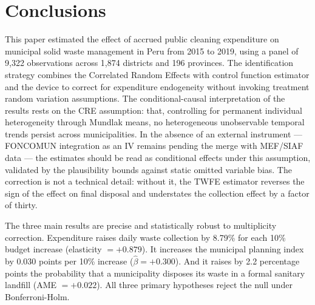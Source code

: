 
\section{Conclusions}
\label{sec:conclusiones}

This paper estimated the effect of accrued public cleaning expenditure on municipal solid waste management in Peru from 2015 to 2019, using a panel of 9,322 observations across 1,874 districts and 196 provinces. The identification strategy combines the Correlated Random Effects with control function estimator \citep{Wooldridge2015} and the \citet{Mundlak1978} device to correct for expenditure endogeneity without invoking treatment random variation assumptions. The conditional-causal interpretation of the results rests on the CRE assumption: that, controlling for permanent individual heterogeneity through Mundlak means, no heterogeneous unobservable temporal trends persist across municipalities. In the absence of an external instrument --- FONCOMUN integration as an IV remains pending the merge with MEF/SIAF data --- the estimates should be read as conditional effects under this assumption, validated by the \citet{Oster2019} plausibility bounds against static omitted variable bias. The correction is not a technical detail: without it, the TWFE estimator reverses the sign of the effect on final disposal and understates the collection effect by a factor of thirty.

The three main results are precise and statistically robust to multiplicity correction. Expenditure raises daily waste collection by 8.79\% for each 10\% budget increase (elasticity $= +0.879$). It increases the municipal planning index by 0.030 points per 10\% increase ($\hat{\beta} = +0.300$). And it raises by 2.2 percentage points the probability that a municipality disposes its waste in a formal sanitary landfill (AME $= +0.022$). All three primary hypotheses reject the null under Bonferroni-Holm.

